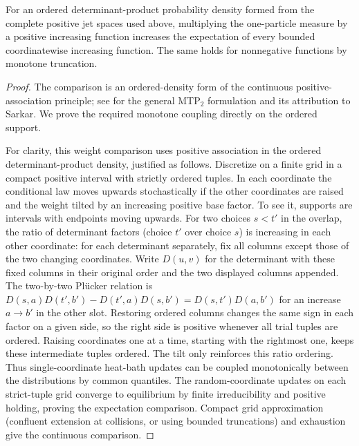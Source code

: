 \begin{lemma}\label{lemma:weight-association}
For an ordered determinant-product probability density formed from the complete positive jet spaces used above, multiplying the one-particle measure by a positive increasing function increases the expectation of every bounded coordinatewise increasing function. The same holds for nonnegative functions by monotone truncation.\end{lemma}
\begin{proof}
The comparison is an ordered-density form of the continuous positive-association principle; see \cite[Theorem~2.27]{Bogso2014} for the general MTP$_2$ formulation and its attribution to Sarkar. We prove the required monotone coupling directly on the ordered support.

For clarity, this weight comparison uses positive association in the ordered determinant-product density, justified as follows. Discretize on a finite grid in a compact positive interval with strictly ordered tuples. In each coordinate the conditional law moves upwards stochastically if the other coordinates are raised and the weight tilted by an increasing positive base factor. To see it, supports are intervals with endpoints moving upwards. For two choices $s<t'$ in the overlap, the ratio of determinant factors (choice $t'$ over choice $s$) is increasing in each other coordinate: for each determinant separately, fix all columns except those of the two changing coordinates. Write $D(u,v)$ for the determinant with these fixed columns in their original order and the two displayed columns appended. The two-by-two Plücker relation is $D(s,a)D(t',b')-D(t',a)D(s,b')=D(s,t')D(a,b')$ for an increase $a\to b'$ in the other slot. Restoring ordered columns changes the same sign in each factor on a given side, so the right side is positive whenever all trial tuples are ordered. Raising coordinates one at a time, starting with the rightmost one, keeps these intermediate tuples ordered. The tilt only reinforces this ratio ordering. Thus single-coordinate heat-bath updates can be coupled monotonically between the distributions by common quantiles. The random-coordinate updates on each strict-tuple grid converge to equilibrium by finite irreducibility and positive holding, proving the expectation comparison. Compact grid approximation (confluent extension at collisions, or using bounded truncations) and exhaustion give the continuous comparison.
\end{proof}

